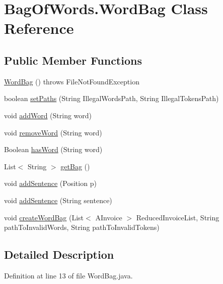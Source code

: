 \hypertarget{class_bag_of_words_1_1_word_bag}{\section{Bag\-Of\-Words.\-Word\-Bag Class Reference}
\label{class_bag_of_words_1_1_word_bag}
}
\subsection*{Public Member Functions}
\begin{DoxyCompactItemize}
\item 
\hyperlink{class_bag_of_words_1_1_word_bag_a7464ca7b08fa51ee8f4967b017896a7e}{Word\-Bag} ()  throws File\-Not\-Found\-Exception
\item 
boolean \hyperlink{class_bag_of_words_1_1_word_bag_ad96f1fd5eec992c63057662c5a89e0ef}{set\-Paths} (String Illegal\-Words\-Path, String Illegal\-Tokens\-Path)
\item 
void \hyperlink{class_bag_of_words_1_1_word_bag_a3aad2cb0de46bbc029e3c8d59eb9cda3}{add\-Word} (String word)
\item 
void \hyperlink{class_bag_of_words_1_1_word_bag_a0c4bd3144d99a6b98c63f97704cfafaa}{remove\-Word} (String word)
\item 
Boolean \hyperlink{class_bag_of_words_1_1_word_bag_a1b34ea94ef1ecf6428d321b2fd5e0359}{has\-Word} (String word)
\item 
List$<$ String $>$ \hyperlink{class_bag_of_words_1_1_word_bag_ab2b3aa2a9ea3821cf365878f954a5abd}{get\-Bag} ()
\item 
void \hyperlink{class_bag_of_words_1_1_word_bag_a540190bee1fcf153d1a9f0bcb9fe2cd0}{add\-Sentence} (Position p)
\item 
void \hyperlink{class_bag_of_words_1_1_word_bag_a9c60c49329b0ef68e47c7af85eccae00}{add\-Sentence} (String sentence)
\item 
void \hyperlink{class_bag_of_words_1_1_word_bag_ae44ab1194be23aee5c5b8f7d37658158}{create\-Word\-Bag} (List$<$ A\-Invoice $>$ Reduced\-Invoice\-List, String path\-To\-Invalid\-Words, String path\-To\-Invalid\-Tokens)
\end{DoxyCompactItemize}


\subsection{Detailed Description}


Definition at line 13 of file Word\-Bag.\-java.



